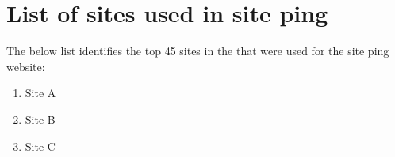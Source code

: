 \chapter{List of sites used in site ping}\label{sec:sites_list}

The below list identifies the top 45 sites in the \us that were used for the site ping website:

\begin{enumerate}
    \item Site A
    \item Site B
    \item Site C
\end{enumerate}